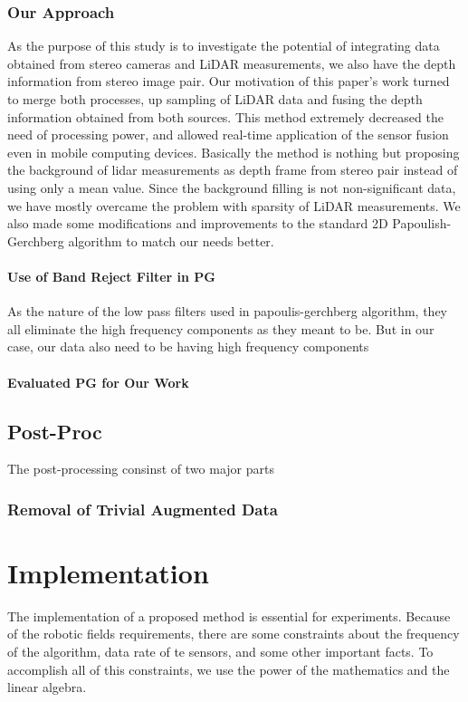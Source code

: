 \documentclass[conference]{IEEEtran}
\begin{document}
\subsubsection{Our Approach}
As the purpose of this study is to investigate the potential of integrating data obtained from stereo cameras and LiDAR measurements, we also have the depth information from stereo image pair. Our motivation of this paper's work turned to merge both processes, up sampling of LiDAR data and fusing the depth information obtained from both sources. This method extremely decreased the need of processing power, and allowed real-time application of the sensor fusion even in mobile computing devices.
Basically the method is nothing but proposing the background of lidar measurements as depth frame from stereo pair instead of using only a mean value. Since the background filling is not non-significant data, we have mostly overcame the problem with sparsity of LiDAR measurements.
We also made some modifications and improvements to the standard 2D Papoulish-Gerchberg algorithm to match our needs better.
\paragraph{Use of Band Reject Filter in PG}
As the nature of the low pass filters used in papoulis-gerchberg algorithm, they all eliminate the high frequency components as they meant to be. But in our case, our data also need to be having high frequency components 
\paragraph{Evaluated PG for Our Work}

\subsection{Post-Proc}

The post-processing consinst of two major parts 

\subsubsection{Removal of Trivial Augmented Data}

\section{Implementation} \label{implementation}

The implementation of a proposed method is essential for experiments. Because of the robotic fields requirements, there are some constraints about the frequency of the algorithm, data rate of te sensors, and some other important facts. To accomplish all of this constraints, we use the power of the mathematics and the linear algebra. 
\end{document}
